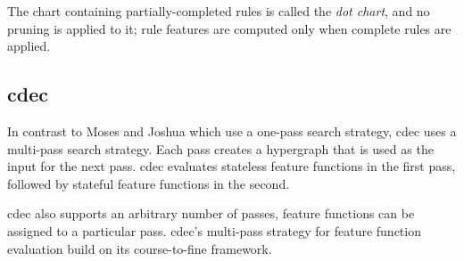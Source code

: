 \documentclass{pbml}
\begin{document}
The chart containing partially-completed rules is called the \emph{dot chart}, and no pruning is
applied to it; rule features are computed only when complete rules are applied.


\subsection{cdec}
In contrast to Moses and Joshua which use a one-pass search strategy, cdec uses a multi-pass search strategy. %
Each pass creates a hypergraph that is used as the input for the next pass. cdec evaluates stateless feature functions in the first pass, followed by stateful feature functions in the second. 

cdec also supports an arbitrary number of passes, feature functions can be assigned to a particular
pass. cdec's multi-pass strategy for feature function evaluation build on its course-to-fine framework.
\end{document}
